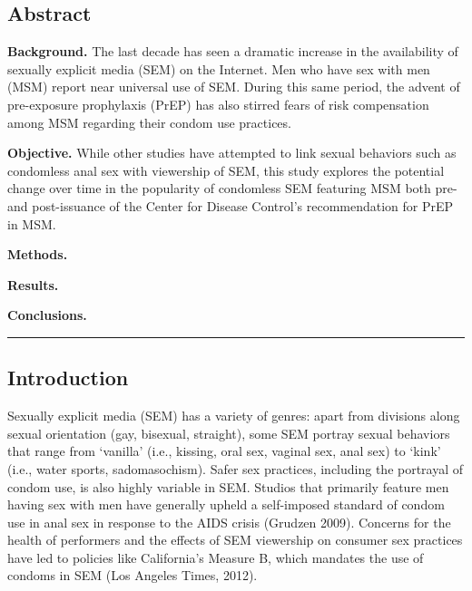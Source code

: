 \documentclass[]{article}
\begin{document}
\subsection{Abstract}\label{abstract}

\textbf{Background. } The last decade has seen a dramatic increase in
the availability of sexually explicit media (SEM) on the Internet. Men
who have sex with men (MSM) report near universal use of SEM. During
this same period, the advent of pre-exposure prophylaxis (PrEP) has also
stirred fears of risk compensation among MSM regarding their condom use
practices.

\textbf{Objective. } While other studies have attempted to link sexual
behaviors such as condomless anal sex with viewership of SEM, this study
explores the potential change over time in the popularity of condomless
SEM featuring MSM both pre- and post-issuance of the Center for Disease
Control's recommendation for PrEP in MSM.

\textbf{Methods. }

\textbf{Results. }

\textbf{Conclusions. }

\begin{center}\rule{0.5\linewidth}{\linethickness}\end{center}

\subsection{Introduction}\label{introduction}

Sexually explicit media (SEM) has a variety of genres: apart from
divisions along sexual orientation (gay, bisexual, straight), some SEM
portray sexual behaviors that range from `vanilla' (i.e., kissing, oral
sex, vaginal sex, anal sex) to `kink' (i.e., water sports,
sadomasochism). Safer sex practices, including the portrayal of condom
use, is also highly variable in SEM. Studios that primarily feature men
having sex with men have generally upheld a self-imposed standard of
condom use in anal sex in response to the AIDS crisis (Grudzen 2009).
Concerns for the health of performers and the effects of SEM viewership
on consumer sex practices have led to policies like California's Measure
B, which mandates the use of condoms in SEM (Los Angeles Times, 2012).
\end{document}
